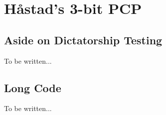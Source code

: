 \section{H\aa stad's 3-bit PCP}
\subsection{Aside on Dictatorship Testing}
To be written...
\subsection{Long Code}
To be written...

